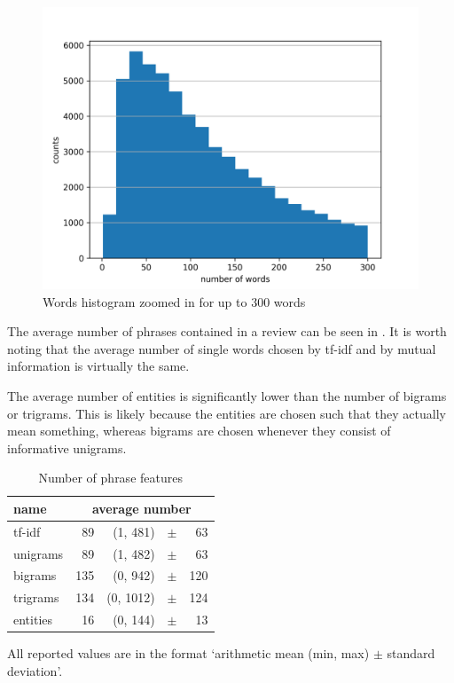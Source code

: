\begin{figure}[ht]\centering
	\includegraphics[width=130mm]{figures/word_hist_cropped.png}
\caption{Words histogram zoomed in for up to 300 words}\label{fig:word_hist_crop}
\end{figure}


The average number of phrases contained in a review can be seen in .
It is worth noting that the average number of single words chosen by tf-idf and by mutual information is virtually the same.

The average number of entities is significantly lower than the number of bigrams or trigrams.
This is likely because the entities are chosen such that they actually mean something,
whereas bigrams are chosen whenever they consist of informative unigrams.
\begin{table}[h!]
\centering
\begin{tabular}{lr@{~}r@{~}r@{~}r}
\toprule
\textbf{name}	& \multicolumn{4}{c}{\textbf{average number}} \\
\midrule
tf-idf  & 89 & (1, 481) & $\pm$& 63 \\
unigrams & 89 & (1, 482) & $\pm$& 63 \\
bigrams & 135 & (0, 942) & $\pm$ &120 \\
trigrams & 134 & (0, 1012) & $\pm$& 124 \\
entities & 16 & (0, 144) & $\pm$ &13 \\
\bottomrule
\end{tabular}


\caption{Number of phrase features}\label{tab:phrase_feat_nu}
All reported values are in the format `arithmetic mean (min, max) $\pm$ standard deviation'.
\end{table}


